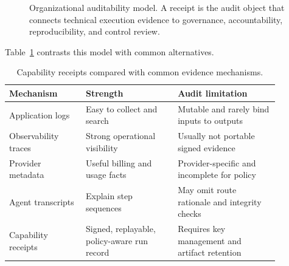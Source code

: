 \documentclass[conference]{IEEEtran}
\begin{document}
\begin{figure}[t]
\centering
{}
\caption{Organizational auditability model. A receipt is the audit object that
connects technical execution evidence to governance, accountability,
reproducibility, and control review.}
\label{fig:auditability}
\end{figure}

Table~\ref{tab:comparison} contrasts this model with common alternatives.

\begin{table}[t]
\centering
\caption{Capability receipts compared with common evidence mechanisms.}
\label{tab:comparison}
\small
\begin{tabular}{@{}>{\raggedright\arraybackslash}p{0.25\linewidth}>{\raggedright\arraybackslash}p{0.30\linewidth}>{\raggedright\arraybackslash}p{0.33\linewidth}@{}}
\toprule
Mechanism & Strength & Audit limitation \\
\midrule
Application logs & Easy to collect and search & Mutable and rarely bind inputs to outputs \\
Observability traces & Strong operational visibility & Usually not portable signed evidence \\
Provider metadata & Useful billing and usage facts & Provider-specific and incomplete for policy \\
Agent transcripts & Explain step sequences & May omit route rationale and integrity checks \\
Capability receipts & Signed, replayable, policy-aware run record & Requires key management and artifact retention \\
\bottomrule
\end{tabular}
\end{table}
\end{document}
